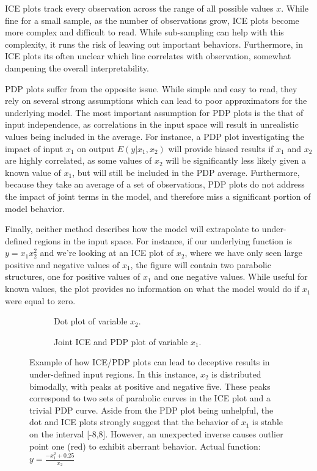 ICE plots track every observation across the range of all possible values $x$. While fine for a small sample, as the number of observations grow, ICE plots become more complex and difficult to read. While sub-sampling can help with this complexity, it runs the risk of leaving out important behaviors. Furthermore, in ICE plots its often unclear which line correlates with observation, somewhat dampening the overall interpretability. 

PDP plots suffer from the opposite issue. While simple and easy to read, they rely on several strong assumptions which can lead to poor approximators for the underlying model. The most important assumption for PDP plots is the that of input independence, as correlations in the input space will result in unrealistic values being included in the average. For instance, a PDP plot investigating the impact of input $x_1$ on output $E(y|x_1, x_2)$ will provide biased results if $x_1$ and $x_2$ are highly correlated, as some values of $x_2$ will be significantly less likely given a known value of $x_1$, but will still be included in the PDP average. Furthermore, because they take an average of a set of observations, PDP plots do not address the impact of joint terms in the model, and therefore miss a significant portion of model behavior. 

Finally, neither method describes how the model will extrapolate to under-defined regions in the input space. For instance, if our underlying function is $y = x_1 x_2^2$ and we’re looking at an ICE plot of $x_2$, where we have only seen large positive and negative values of $x_1$, the figure will contain two parabolic structures, one for positive values of $x_1$ and one negative values. While useful for known values, the plot provides no information on what the model would do if $x_1$ were equal to zero. 

\begin{figure}
\centering
\begin{subfigure}{.5\textwidth}
  \centering
  
  \caption{Dot plot of variable $x_2$.}
\end{subfigure}%
\begin{subfigure}{.5\textwidth}
  \centering
  
  \caption{Joint ICE and PDP plot of variable $x_1$.}
\end{subfigure}
\caption{Example of how ICE/PDP plots can lead to deceptive results in under-defined input regions. In this instance, $x_2$ is distributed bimodally, with peaks at positive and negative five. These peaks correspond to two sets of parabolic curves in the ICE plot and a trivial PDP curve. Aside from the PDP plot being unhelpful, the dot and ICE plots strongly suggest that the behavior of $x_1$ is stable on the interval [-8,8]. However, an unexpected inverse causes outlier point one (red) to exhibit aberrant behavior. Actual function: $y = \frac{-x_1^2 + 0.25}{x_2}$}

\label{fig:custom}
\end{figure}

